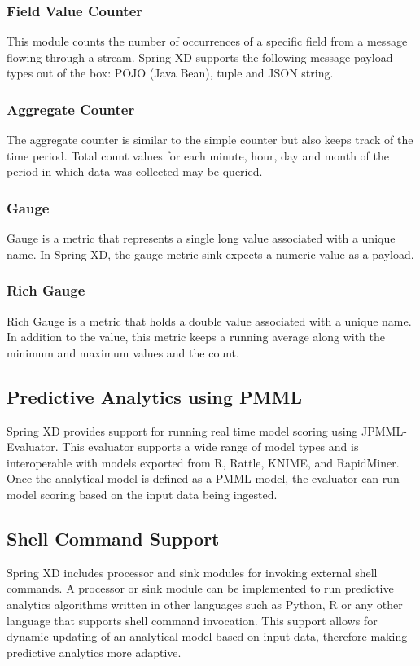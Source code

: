 \subsubsection {Field Value Counter}

This module counts the number of occurrences of a specific field from a message
flowing through a stream. Spring XD supports the following message payload types
out of the box: POJO (Java Bean), tuple and JSON\cite{json} string.

\subsubsection {Aggregate Counter}

The aggregate counter is similar to the simple counter but also keeps track of
the time period. Total count values for each minute, hour, day and month
of the period in which data was collected may be queried.

\subsubsection {Gauge}
Gauge is a metric that represents a single long value associated with a unique name.
In Spring XD, the gauge metric sink expects a numeric value as a payload.

\subsubsection {Rich Gauge}
Rich Gauge is a metric that holds a double value associated with a unique name. In
addition to the value, this metric keeps a running average along with the minimum and
maximum values and the count.

\subsection {Predictive Analytics using PMML}
Spring XD provides support for running real time model scoring using JPMML-Evaluator.
This evaluator supports a wide range of model types and is interoperable with
models exported from R, Rattle, KNIME, and RapidMiner. Once the analytical model
is defined as a PMML model, the evaluator can run model scoring based on the 
input data being ingested.

\subsection {Shell Command Support}
Spring XD includes processor and sink modules for invoking external shell commands.
A processor or sink module can be implemented to run predictive
analytics algorithms written in other languages such as Python, R or any other language that
supports shell command invocation. This support allows for dynamic updating of
an analytical model based on input data, therefore making predictive analytics more adaptive.

